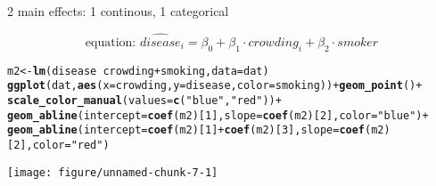 \documentclass[table]{beamer}\usepackage[]{graphicx}\usepackage[]{color}
\makeatletter
\def\maxwidth{ %
  \ifdim\Gin@nat@width>\linewidth
    \linewidth
  \else
    \Gin@nat@width
  \fi
}
\newcommand{\hlnum}[1]{\textcolor[rgb]{0.686,0.059,0.569}{#1}}%
\newcommand{\hlstr}[1]{\textcolor[rgb]{0.192,0.494,0.8}{#1}}%
\newcommand{\hlopt}[1]{\textcolor[rgb]{0,0,0}{#1}}%
\newcommand{\hlstd}[1]{\textcolor[rgb]{0.345,0.345,0.345}{#1}}%
\newcommand{\hlkwb}[1]{\textcolor[rgb]{0.69,0.353,0.396}{#1}}%
\newcommand{\hlkwc}[1]{\textcolor[rgb]{0.333,0.667,0.333}{#1}}%
\newcommand{\hlkwd}[1]{\textcolor[rgb]{0.737,0.353,0.396}{\textbf{#1}}}%
\newenvironment{kframe}{%
 \def\at@end@of@kframe{}%
 \ifinner\ifhmode%
  \def\at@end@of@kframe{\end{minipage}}%
  \begin{minipage}{\columnwidth}%
 \fi\fi%
 \def\FrameCommand##1{\hskip\@totalleftmargin \hskip-\fboxsep
 \colorbox{shadecolor}{##1}\hskip-\fboxsep
     \hskip-\linewidth \hskip-\@totalleftmargin \hskip\columnwidth}%
 \MakeFramed {\advance\hsize-\width
   \@totalleftmargin\z@ \linewidth\hsize
   \@setminipage}}%
 {\par\unskip\endMakeFramed%
 \at@end@of@kframe}
\newenvironment{knitrout}{}{} %
\makeatother
\begin{document}

\begin{frame}[fragile]{2 main effects: 1 continous, 1 categorical}

$$ \mbox{equation: \ }  \widehat{disease}_i = \beta_0 + \beta_1\cdot crowding_i + \beta_2 \cdot smoker $$

\begin{knitrout}\scriptsize
{}\color{fgcolor}\begin{kframe}
\begin{alltt}
\hlstd{m2} \hlkwb{<-} \hlkwd{lm}\hlstd{(disease} \hlopt{~} \hlstd{crowding} \hlopt{+} \hlstd{smoking,} \hlkwc{data}\hlstd{=dat)}
\hlkwd{ggplot}\hlstd{(dat,} \hlkwd{aes}\hlstd{(}\hlkwc{x}\hlstd{=crowding,} \hlkwc{y}\hlstd{=disease,} \hlkwc{color}\hlstd{=smoking))} \hlopt{+} \hlkwd{geom_point}\hlstd{()} \hlopt{+}
  \hlkwd{scale_color_manual}\hlstd{(}\hlkwc{values} \hlstd{=} \hlkwd{c}\hlstd{(}\hlstr{"blue"}\hlstd{,} \hlstr{"red"}\hlstd{))} \hlopt{+}
  \hlkwd{geom_abline}\hlstd{(}\hlkwc{intercept} \hlstd{=} \hlkwd{coef}\hlstd{(m2)[}\hlnum{1}\hlstd{],} \hlkwc{slope} \hlstd{=} \hlkwd{coef}\hlstd{(m2)[}\hlnum{2}\hlstd{],} \hlkwc{color}\hlstd{=}\hlstr{"blue"}\hlstd{)} \hlopt{+}
  \hlkwd{geom_abline}\hlstd{(}\hlkwc{intercept} \hlstd{=} \hlkwd{coef}\hlstd{(m2)[}\hlnum{1}\hlstd{]}\hlopt{+}\hlkwd{coef}\hlstd{(m2)[}\hlnum{3}\hlstd{],} \hlkwc{slope} \hlstd{=} \hlkwd{coef}\hlstd{(m2)[}\hlnum{2}\hlstd{],} \hlkwc{color}\hlstd{=}\hlstr{"red"}\hlstd{)}
\end{alltt}
\end{kframe}
\texttt{[image: figure/unnamed-chunk-7-1]} 
\end{knitrout}

\end{frame}


\end{document}
